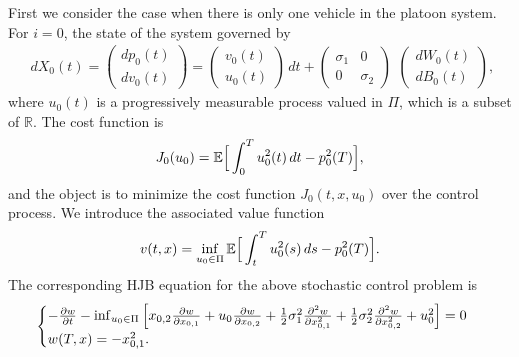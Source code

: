\documentclass{article}
\begin{document}
First we consider the case when there is only one vehicle in the platoon system. For $i = 0$, the state of the system governed by
\begin{equation} \label{node danamic, N = 0}
\begin{array}{c}
d  X_{0}(t) =
  \left(   \begin{array}{c}
    d  p_{0}(t) \\
    d  v_{0}(t)
  \end{array}   \right)  = 
\left(    \begin{array}{c}
    v_{0}(t) \\
    u_{0}(t)
  \end{array}   \right) \, d t + 
\left(   \begin{array}{cc}
    \sigma_{1} &  0 \\
    0 & \sigma_{2}
  \end{array}   \right)
\end{array}
\left(    \begin{array}{c}
   d W_{0}(t) \\
   d B_{0}(t)
  \end{array}   \right),
\end{equation}
where $u_{0}(t)$ is a progressively measurable process valued in $\Pi$, which is a subset of $\mathbb{R}$. The cost function is
\begin{equation}
    J_{0} (u_{0}) = \mathbb{E} \Big{[} \int_{0}^{T} u_{0}^{2}(t) \, d t - p_{0}^{2}(T) \Big{]},
\end{equation}
and the object is to minimize the cost function $J_{0} (t, x, u_{0})$ over the control process. We introduce the associated value function
\begin{equation*}
    v(t, x) = \inf_{u_{0} \in \Pi} \mathbb{E} \Big{[} \int_{t}^{T} u_{0}^{2}(s) \, d s - p_{0}^{2}(T) \Big{]}.
\end{equation*}
The corresponding HJB equation for the above stochastic control problem is 
\begin{equation} \label{HJB, N=0}
    \begin{cases}
   - \frac{\partial w}{\partial t} - \inf_{u_{0} \in \Pi} \Big{[} x_{0,2} \frac{\partial w}{\partial x_{0, 1}} + u_{0} \frac{\partial w}{\partial x_{0, 2}} + \frac{1}{2} \sigma_{1}^{2} \frac{\partial^{2} w}{\partial x_{0, 1}^{2}} + \frac{1}{2} \sigma_{2}^{2} \frac{\partial^{2} w}{\partial x_{0, 2}^{2}} + u_{0}^{2} \Big{]}   = 0  \\
   w(T, x) = - x_{0, 1}^{2}.
   \end{cases}
\end{equation}
\end{document}
